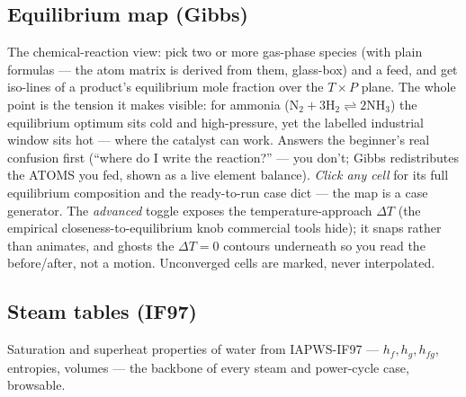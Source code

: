 \documentclass[11pt,a4paper]{article}
\begin{document}
\subsection{Equilibrium map (Gibbs)}
The chemical-reaction view: pick two or more gas-phase species (with plain
formulas --- the atom matrix is derived from them, glass-box) and a feed,
and get iso-lines of a product's equilibrium mole fraction over the
$T\times P$ plane.  The whole point is the tension it makes visible: for
ammonia ($\mathrm{N_2+3H_2\rightleftharpoons 2NH_3}$) the equilibrium
optimum sits cold and high-pressure, yet the labelled industrial window
sits hot --- where the catalyst can work.  Answers the beginner's real
confusion first (``where do I write the reaction?'' --- you don't; Gibbs
redistributes the ATOMS you fed, shown as a live element balance).
\emph{Click any cell} for its full equilibrium composition and the
ready-to-run  case dict --- the map is a case generator.
The \emph{advanced} toggle exposes the temperature-approach $\Delta T$
(the empirical closeness-to-equilibrium knob commercial tools hide); it snaps rather
than animates, and ghosts the $\Delta T = 0$ contours underneath so you
read the before/after, not a motion.  Unconverged cells are marked, never
interpolated.

\subsection{Steam tables (IF97)}
Saturation and superheat properties of water from IAPWS-IF97 ---
$h_f, h_g, h_{fg}$, entropies, volumes --- the backbone of every steam and
power-cycle case, browsable.

\end{document}
